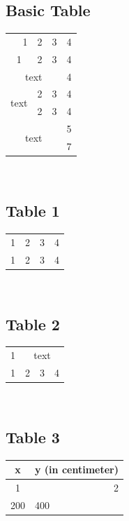 \documentclass[28pt,a4paper]{article}
\begin{document}
\subsection{Basic Table}
\begin{tabular}{|c|c|c|c|}
    \hline
    \multicolumn{1}{|r|}{1}&2&3&4\\
    \cline{1-3}
    1&2&3&4\\
    \hline
    \multicolumn{3}{|c|}{text} & 4\\
    \hline
    \multirow{2}{*}{text} &2&3&4\\
    \cline{2-4}
    &2&3&4\\
    \hline
    \multicolumn{3}{|c|}{\multirow{2}{*}{text}} &5\\
    \multicolumn{3}{|c|}{}&7\\
    \hline
\end{tabular}\\

\subsection{Table 1}

\begin{tabular}{|c| c cc|}
    \hline
    1&2&3&4\\
    \cline{1-3}
    1&2&3&4\\
    \hline
\end{tabular}\\

\subsection{Table 2}

\begin{tabular}{|c|c c c|}
     \hline
     1 & \multicolumn{3}{|c|}{text}\\
     \cline{2-4}
     1&2&3&4\\
     \hline
\end{tabular}\\

\subsection{Table 3}
\begin{tabular}{|c p{2cm}|}
    \hline
    x & y (in centimeter) \\
    \hline
    1 & \multicolumn{1}{r|}{2} \\
    200 & 400 \\
    \hline
\end{tabular}\\
\end{document}

